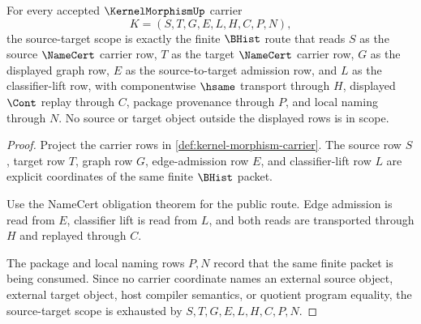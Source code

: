 \begin{theorem}
\label{thm:kernel-morphism-source-target-scope}
For every accepted $\KernelMorphismUp$ carrier
$$
K=(S,T,G,E,L,H,C,P,N),
$$
the source-target scope is exactly the finite $\BHist$ route that reads $S$ as the source $\NameCert$ carrier row, $T$ as the target $\NameCert$ carrier row, $G$ as the displayed graph row, $E$ as the source-to-target admission row, and $L$ as the classifier-lift row, with componentwise $\hsame$ transport through $H$, displayed $\Cont$ replay through $C$, package provenance through $P$, and local naming through $N$. No source or target object outside the displayed rows is in scope.
\end{theorem}
\begin{proof}
Project the carrier rows in \autoref{def:kernel-morphism-carrier}. The source row $S$, target row $T$, graph row $G$, edge-admission row $E$, and classifier-lift row $L$ are explicit coordinates of the same finite $\BHist$ packet.

Use the NameCert obligation theorem for the public route. Edge admission is read from $E$, classifier lift is read from $L$, and both reads are transported through $H$ and replayed through $C$.

The package and local naming rows $P,N$ record that the same finite packet is being consumed. Since no carrier coordinate names an external source object, external target object, host compiler semantics, or quotient program equality, the source-target scope is exhausted by $S,T,G,E,L,H,C,P,N$.
\end{proof}

